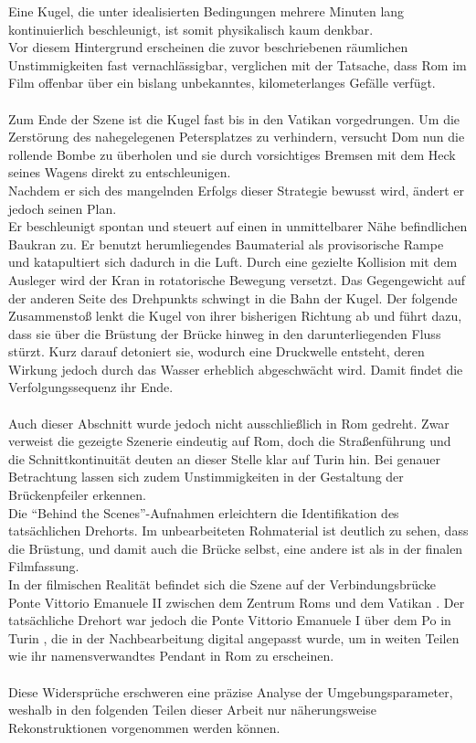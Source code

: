 Eine Kugel, die unter idealisierten Bedingungen mehrere Minuten lang kontinuierlich beschleunigt, ist somit physikalisch kaum denkbar.  
\\
Vor diesem Hintergrund erscheinen die zuvor beschriebenen räumlichen Unstimmigkeiten fast vernachlässigbar, verglichen mit der Tatsache, dass Rom im Film offenbar über ein bislang unbekanntes, kilometerlanges Gefälle verfügt.
\\
\\
Zum Ende der Szene ist die Kugel fast bis in den Vatikan vorgedrungen. Um die Zerstörung des nahegelegenen Petersplatzes zu verhindern, versucht Dom nun die rollende Bombe zu überholen und sie durch vorsichtiges Bremsen mit dem Heck seines Wagens direkt zu entschleunigen.
\\
Nachdem er sich des mangelnden Erfolgs dieser Strategie bewusst wird, ändert er jedoch seinen Plan. 
\\
Er beschleunigt spontan und steuert auf einen in unmittelbarer Nähe befindlichen Baukran zu. Er benutzt herumliegendes Baumaterial als provisorische Rampe und katapultiert sich dadurch in die Luft. Durch eine gezielte Kollision mit dem Ausleger wird der Kran in rotatorische Bewegung versetzt. Das Gegengewicht auf der anderen Seite des Drehpunkts schwingt in die Bahn der Kugel. Der folgende Zusammenstoß lenkt die Kugel von ihrer bisherigen Richtung ab und führt dazu, dass sie über die Brüstung der Brücke hinweg in den darunterliegenden Fluss stürzt. Kurz darauf detoniert sie, wodurch eine Druckwelle entsteht, deren Wirkung jedoch durch das Wasser erheblich abgeschwächt wird. Damit findet die Verfolgungssequenz ihr Ende.
\\
\\%
Auch dieser Abschnitt wurde jedoch nicht ausschließlich in Rom gedreht. Zwar verweist die gezeigte Szenerie eindeutig auf Rom, doch die Straßenführung und die Schnittkontinuität deuten an dieser Stelle klar auf Turin hin. Bei genauer Betrachtung lassen sich zudem Unstimmigkeiten in der Gestaltung der Brückenpfeiler erkennen.  
\\
Die \enquote{Behind the Scenes}-Aufnahmen erleichtern die Identifikation des tatsächlichen Drehorts. Im unbearbeiteten Rohmaterial ist deutlich zu sehen, dass die Brüstung, und damit auch die Brücke selbst, eine andere ist als in der finalen Filmfassung.  
\\
In der filmischen Realität befindet sich die Szene auf der Verbindungsbrücke Ponte Vittorio Emanuele II zwischen dem Zentrum Roms und dem Vatikan \parencite{RomePonteII}.  
Der tatsächliche Drehort war jedoch die Ponte Vittorio Emanuele I über dem Po in Turin \parencite{TurinPonteI}, die in der Nachbearbeitung digital angepasst wurde, um in weiten Teilen wie ihr namensverwandtes Pendant in Rom zu erscheinen.
\\
\\
Diese Widersprüche erschweren eine präzise Analyse der Umgebungsparameter, weshalb in den folgenden Teilen dieser Arbeit nur näherungsweise Rekonstruktionen vorgenommen werden können.


